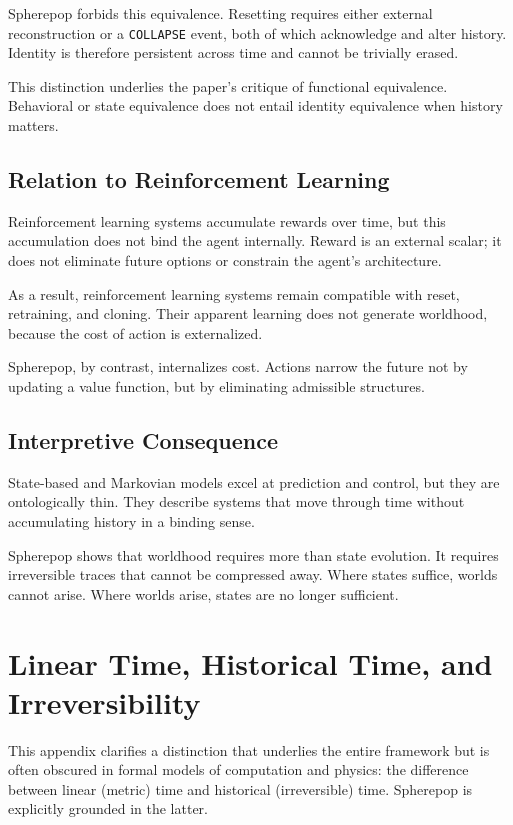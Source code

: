 \documentclass[11pt]{article}
\begin{document}
Spherepop forbids this equivalence. Resetting requires either external reconstruction or a \texttt{COLLAPSE} event, both of which acknowledge and alter history. Identity is therefore persistent across time and cannot be trivially erased.

This distinction underlies the paper’s critique of functional equivalence. Behavioral or state equivalence does not entail identity equivalence when history matters.

\subsection{Relation to Reinforcement Learning}

Reinforcement learning systems accumulate rewards over time, but this accumulation does not bind the agent internally. Reward is an external scalar; it does not eliminate future options or constrain the agent’s architecture.

As a result, reinforcement learning systems remain compatible with reset, retraining, and cloning. Their apparent learning does not generate worldhood, because the cost of action is externalized.

Spherepop, by contrast, internalizes cost. Actions narrow the future not by updating a value function, but by eliminating admissible structures.

\subsection{Interpretive Consequence}

State-based and Markovian models excel at prediction and control, but they are ontologically thin. They describe systems that move through time without accumulating history in a binding sense.

Spherepop shows that worldhood requires more than state evolution. It requires irreversible traces that cannot be compressed away. Where states suffice, worlds cannot arise. Where worlds arise, states are no longer sufficient.

\section{Linear Time, Historical Time, and Irreversibility}

This appendix clarifies a distinction that underlies the entire framework but is often obscured in formal models of computation and physics: the difference between linear (metric) time and historical (irreversible) time. Spherepop is explicitly grounded in the latter.
\end{document}

